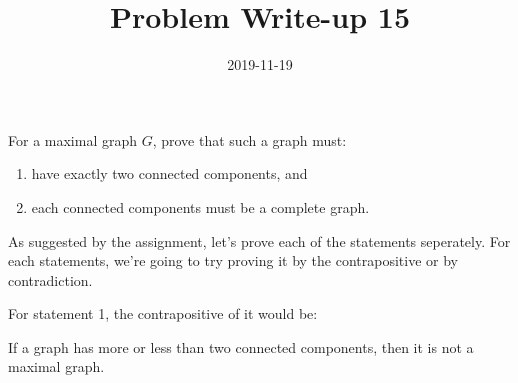 \documentclass[a4paper,12pt]{article}
\title{Problem Write-up 15}
\date{2019-11-19}
\begin{document}
    \begin{problem}
        For a maximal graph \(G\), prove that such a graph must:
        \begin{enumerate}[1.]
            \item have exactly two connected components, and
            \item each connected components must be a complete graph.
        \end{enumerate}
    \end{problem}
    
    \begin{answer}
        As suggested by the assignment, let's prove each of the statements seperately. For each statements, we're going to try proving it by the contrapositive or by contradiction.

        For statement 1, the contrapositive of it would be:
        \begin{contrapositive}
            If a graph has more or less than two connected components, then it is not a maximal graph.
        \end{contrapositive}
    \end{answer}
\end{document}
